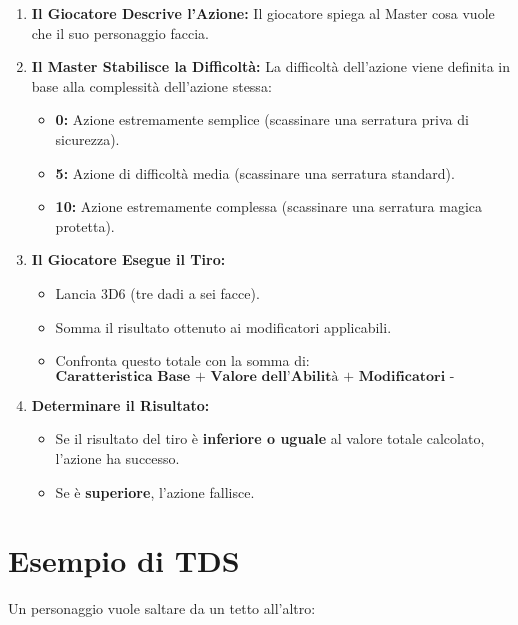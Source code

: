 \documentclass[../manuale_main.tex]{subfiles}
\begin{document}
\begin{enumerate}
    \item \textbf{Il Giocatore Descrive l'Azione:} Il giocatore spiega al Master cosa vuole che il suo personaggio faccia.
    
    \item \textbf{Il Master Stabilisce la Difficoltà:} La difficoltà dell'azione viene definita in base alla complessità dell'azione stessa:
    \begin{itemize}
        \item \textbf{0:} Azione estremamente semplice (scassinare una serratura priva di sicurezza).
        \item \textbf{5:} Azione di difficoltà media (scassinare una serratura standard).
        \item \textbf{10:} Azione estremamente complessa (scassinare una serratura magica protetta).
    \end{itemize}
    
    \item \textbf{Il Giocatore Esegue il Tiro:} 
    \begin{itemize}
        \item Lancia 3D6 (tre dadi a sei facce).
        \item Somma il risultato ottenuto ai modificatori applicabili.
        \item Confronta questo totale con la somma di:
        \[
        \textbf{Caratteristica Base + Valore dell’Abilità + Modificatori - Difficoltà}
        \]
    \end{itemize}
    
    \item \textbf{Determinare il Risultato:} 
    \begin{itemize}
        \item Se il risultato del tiro è \textbf{inferiore o uguale} al valore totale calcolato, l'azione ha successo.
        \item Se è \textbf{superiore}, l'azione fallisce.
    \end{itemize}
\end{enumerate}

\vspace{0.3cm}

\section{Esempio di TDS}
Un personaggio vuole saltare da un tetto all'altro:
\end{document}
